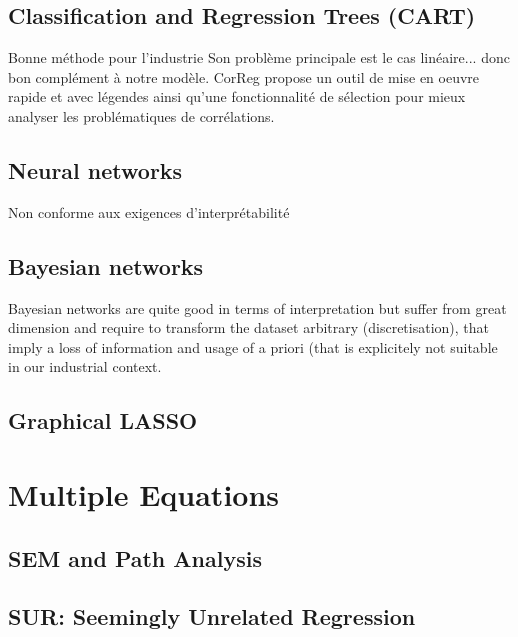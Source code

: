 \documentclass[12pt,a4paper]{report}
\begin{document}
\subsection{Classification and Regression Trees (CART)}
		\cite{breiman1984classification}%
		Bonne méthode pour l'industrie
		Son problème principale est le cas linéaire... donc bon complément à notre modèle.
		CorReg propose un outil de mise en oeuvre rapide et avec légendes ainsi qu'une fonctionnalité de sélection pour mieux analyser les problématiques de corrélations.		
	
	\subsection{Neural networks}	
		\cite{fausett1994fundamentals}
		Non conforme aux exigences d'interprétabilité
	\subsection{Bayesian networks}
		\cite{heckerman1995learning,jensen2007bayesian,friedman2000using}
		Bayesian networks are quite good in terms of interpretation but suffer from great dimension and require to transform the dataset arbitrary (discretisation), that imply a loss of information and usage of a priori (that is explicitely not suitable in our industrial context. 
		
		
\subsection{Graphical LASSO}
			\cite{friedman2008sparse,witten2011new,tibshiranilasso,friedman2010applications}		
		
	\section{Multiple Equations}		%
		
		\subsection{SEM and Path Analysis}		%
			\cite{davidson1993estimation,pearl2000causality,pearl1998graphs,brito2006graphical,mcdonald2002principles}
		\subsection{SUR: Seemingly Unrelated Regression}		%
\end{document}
